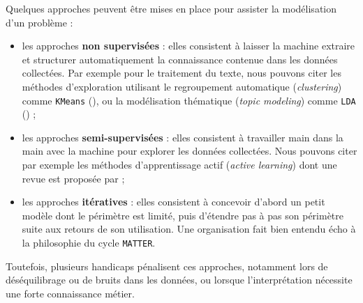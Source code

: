 			\begin{leftBarIdea}
				Quelques approches peuvent être mises en place pour assister la modélisation d'un problème :
				\begin{itemize}
					\item les approches \textbf{non supervisées} :
					elles consistent à laisser la machine extraire et structurer automatiquement la connaissance contenue dans les données collectées.
					Par exemple pour le traitement du texte, nous pouvons citer les méthodes d'exploration utilisant le regroupement automatique (\textit{clustering}) comme \texttt{KMeans} (\cite{macqueen:1967:methods-classification-analysis}), ou la modélisation thématique (\textit{topic modeling}) comme \texttt{LDA} (\cite{blei-etal:2003:latent-dirichlet-allocation}) ;
					\item les approches \textbf{semi-supervisées} :
					elles consistent à travailler main dans la main avec la machine pour explorer les données collectées.
					Nous pouvons citer par exemple les méthodes d'apprentissage actif (\textit{active learning}) dont une revue est proposée par \cite{settles:2010:active-learning-literature} ;
					\item les approches \textbf{itératives} :
					elles consistent à concevoir d'abord un petit modèle dont le périmètre est limité, puis d'étendre pas à pas son périmètre suite aux retours de son utilisation.
					Une organisation fait bien entendu écho à la philosophie du cycle \texttt{MATTER}.
				\end{itemize}
				Toutefois, plusieurs handicaps pénalisent ces approches, notamment lors de déséquilibrage ou de bruits dans les données, ou lorsque l'interprétation nécessite une forte connaissance métier.
			\end{leftBarIdea}
			
